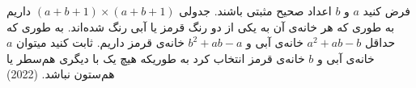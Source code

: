 فرض کنید $a$ و $b$ اعداد صحیح  مثبتی باشند. جدولی  $(a + b + 1) \times (a + b + 1)$ داریم به طوری که هر خانه‌ی آن به یکی از دو رنگ قرمز یا آبی رنگ شده‌اند. به طوری که حداقل $a^2 + ab - b$ خانه‌ی آبی و $b^2 + ab - a$ خانه‌ی قرمز داریم. ثابت کنید میتوان $a$ خانه‌ی آبی و $b$ خانه‌ی قرمز انتخاب کرد به طوریکه هیچ یک با دیگری هم‌سطر یا هم‌ستون نباشد.
(2022)